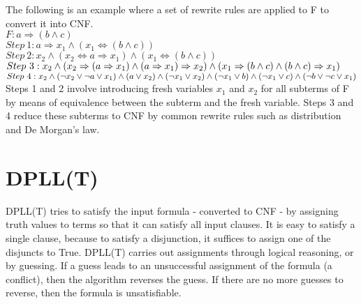 \documentclass{article}
\begin{document}
The following is an example where a set of rewrite rules
are applied to F to convert it into CNF. \\
$F: a \Rightarrow (b \land c)$ \\
$Step\ 1: a \Rightarrow x_1 \land (x_1 \iff (b \land c))$ \\
$Step\ 2: x_2 \land (x_2 \iff a \Rightarrow x_1) \land 
(x_1 \iff (b \land c))$ \\
$Step\ 3: x_2 \land \\
(x_2 \Rightarrow (a \Rightarrow x_1) \land 
(a \Rightarrow x_1) \Rightarrow x_2) \land \\
(x_1 \Rightarrow (b \land c) \land 
(b \land c) \Rightarrow x_1)$ \\
$Step\ 4: x_2 \land \\
(\neg x_2 \lor \neg a \lor x_1) \land 
(a \lor x_2) \land (\neg x_1 \lor x_2) \land \\
(\neg x_1 \lor b) \land (\neg x_1 \lor c) \land 
(\neg b \lor \neg c \lor x_1)$ \\
Steps 1 and 2 involve introducing fresh variables $x_1$
and $x_2$ for all subterms of F by means of equivalence 
between the subterm and the fresh variable. Steps 3 and 4 
reduce these subterms to CNF by common rewrite rules 
such as distribution and De Morgan's law.


\section{DPLL(T)}
DPLL(T) tries to satisfy the input formula - converted to 
CNF - by assigning truth values to terms so that it can
satisfy all input clauses. It is easy to satisfy a single
clause, because to satisfy a disjunction, it suffices to
assign one of the disjuncts to True. DPLL(T) carries out
assignments through logical reasoning, or by guessing. If a
guess leads to an unsuccessful assignment of the formula 
(a conflict), then the algorithm reverses the guess. 
If there are no more guesses to reverse, then the formula is
unsatisfiable.
\end{document}
